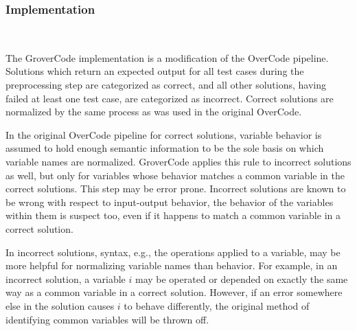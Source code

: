 \documentclass[12pt,twoside]{mitthesis}
\begin{document}
\subsubsection{Implementation}~\label{subsec:grovercodepipeline}

The GroverCode implementation is a modification of the OverCode pipeline. Solutions which return an expected output for all test cases during the preprocessing step are categorized as correct, and all other solutions, having failed at least one test case, are categorized as incorrect. Correct solutions are normalized by the same process as was used in the original OverCode. 

In the original OverCode pipeline for correct solutions, variable behavior is assumed to hold enough semantic information to be the sole basis on which variable names are normalized. GroverCode applies this rule to incorrect solutions as well, but only for variables whose behavior matches a common variable in the correct solutions. This step may be error prone. Incorrect solutions are known to be wrong with respect to input-output behavior, the behavior of the variables within them is suspect too, even if it happens to match a common variable in a correct solution. %


In incorrect solutions, syntax, e.g., the operations applied to a variable, may be more helpful for normalizing variable names than behavior. For example, in an incorrect solution, a variable $i$ may be operated or depended on exactly the same way as a common variable in a correct solution. However, if an error somewhere else in the solution causes $i$ to behave differently, the original method of identifying common variables will be thrown off. %
\end{document}
